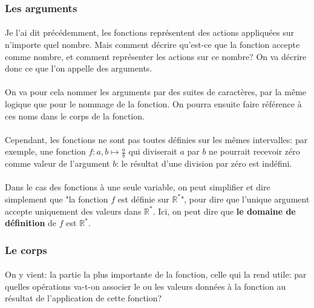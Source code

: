\documentclass[a4paper]{book}
\begin{document}
    \subsubsection{Les arguments}
    \paragraph{}
    Je l'ai dit précédemment, les fonctions représentent des actions appliquées sur n'importe quel nombre. Mais comment décrire qu'est-ce que la fonction accepte comme nombre, et comment représenter les actions sur ce nombre? On va décrire donc ce que l'on appelle des arguments. 
    \paragraph{}
    On va pour cela nommer les arguments par des suites de caractères, par la même logique que pour le nommage de la fonction. On pourra ensuite faire référence à ces noms dans le corps de la fonction.
    \paragraph{}
    Cependant, les fonctions ne sont pas toutes définies sur les mêmes intervalles: par exemple, une fonction $f:a,b\mapsto\frac{a}{b}$ qui diviserait $a$ par $b$ ne pourrait recevoir zéro comme valeur de l'argument $b$: le résultat d'une division par zéro est indéfini. 
    \paragraph{}
    Dans le cas des fonctions à une seule variable, on peut simplifier et dire simplement que "la fonction $f$ est définie sur $\mathds{R}^\ast$", pour dire que l'unique argument accepte uniquement des valeurs dans $\mathds{R}^\ast$. Ici, on peut dire que \textbf{le domaine de définition} de $f$ est $\mathds{R}^\ast$.
    
    
    \subsubsection{Le corps}
    \paragraph{}
    On y vient: la partie la plus importante de la fonction, celle qui la rend utile: par quelles opérations va-t-on associer le ou les valeurs données à la fonction au résultat de l'application de cette fonction?
\end{document}
